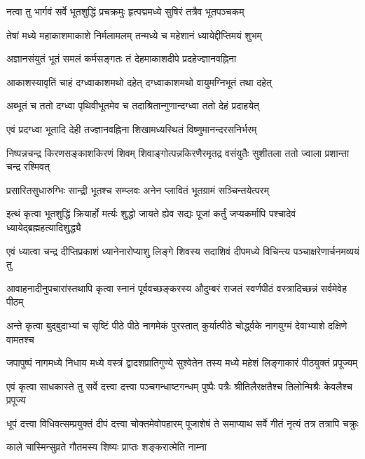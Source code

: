 \twolineshloka
{नत्वा तु भार्गवं सर्वे भूतशुद्धिं प्रचक्रमुः}
{हृत्पद्ममध्ये सुषिरं तत्रैव भूतपञ्चकम्}%

\twolineshloka
{तेषां मध्ये महाकाशमाकाशे निर्मलामलम्}
{तन्मध्ये च महेशानं ध्यायेद्दीप्तिमयं शुभम्}%

\twolineshloka
{अज्ञानसंयुतं भूतं समलं कर्मसङ्गतः}
{तं देहमाकाशदीपे प्रदहेज्ज्ञानवह्निना}%

\twolineshloka
{आकाशस्यावृतिं चाहं दग्ध्वाकाशमथो दहेत्}
{दग्ध्वाकाशमथो वायुमग्निभूतं तथा दहेत्}%

\twolineshloka
{अब्भूतं च ततो दग्ध्वा पृथिवीभूतमेव च}
{तदाश्रितान्गुणान्दग्ध्वा ततो देहं प्रदाहयेत्}%

\twolineshloka
{एवं प्रदग्ध्वा भूतादि देही तज्ज्ञानवह्निना}
{शिखामध्यस्थितं विष्णुमानन्दरसनिर्भरम्}%

\twolineshloka
{निष्पन्नचन्द्र किरणसङ्काशकिरणं शिवम्}
{शिवाङ्गोत्पन्नकिरणैरमृतद्र वसंयुतैः}%
सुशीतला ततो ज्वाला प्रशान्ता चन्द्र रश्मिवत्

\twolineshloka
{प्रसारितसुधारुग्भिः सान्द्री भूतश्च सम्प्लवः}
{अनेन प्लावितं भूतग्रामं सञ्चिन्तयेत्परम्}%

\twolineshloka
{इत्थं कृत्वा भूतशुद्धिं क्रियार्हो मर्त्यः शुद्धो जायते ह्येव सद्यः}
{पूजां कर्तुं जप्यकर्मापि पश्चादेवं ध्यायेद्ब्रह्महत्यादिशुद्ध्यै}%

\twolineshloka
{एवं ध्यात्वा चन्द्र दीप्तिप्रकाशं ध्यानेनारोप्याशु लिङ्गे शिवस्य}
{सदाशिवं दीपमध्ये विचिन्त्य पञ्चाक्षरेणार्चनमव्ययं तु}%

\twolineshloka
{आवाहनादीनुपचारांस्तथापि कृत्वा स्नानं पूर्ववच्छङ्करस्य}
{औदुम्बरं राजतं स्वर्णपीठं वस्त्रादिच्छन्नं सर्वमेवेह पीठम्}%

\twolineshloka
{अन्ते कृत्वा बुद्बुदाभ्यां च सृष्टिं पीठे पीठे नागमेकं पुरस्तात्}
{कुर्यात्पीठे चोर्द्ध्वके नागयुग्मं देवाभ्याशे दक्षिणे वामतश्च}%

\twolineshloka
{जपापुष्पं नागमध्ये निधाय मध्ये वस्त्रं द्वादशप्रातिगुण्ये}
{सुश्वेतेन तस्य मध्ये महेशं लिङ्गाकारं पीठयुक्तं प्रपूज्यम्}%

\twolineshloka
{एवं कृत्वा साधकास्ते तु सर्वे दत्त्वा दत्त्वा पञ्चगन्धाष्टगन्धम्}
{पुष्पैः पत्रैः श्रीतिलैरक्षतैश्च तिलोन्मिश्रैः केवलैश्च प्रपूज्य}%

\twolineshloka
{धूपं दत्त्वा विधिवत्सम्प्रयुक्तं दीपं दत्त्वा चोक्तमेवोपहारम्}
{पूजाशेषं ते समाप्याथ सर्वे गीतं नृत्यं तत्र तत्रापि चक्रुः}%

\onelineshloka
{काले चास्मिन्सुव्रते गौतमस्य शिष्यः प्राप्तः शङ्करात्मेति नाम्ना}%


